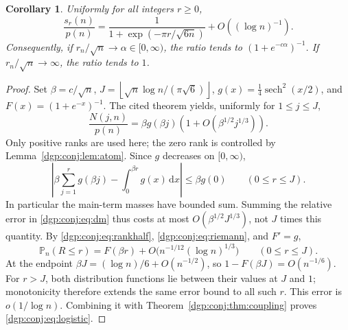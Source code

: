 \documentclass[11pt,letterpaper]{article}
\numberwithin{equation}{section}
\newtheorem{corollary}[theorem]{Corollary}
\theoremstyle{remark}\newtheorem{remark}[theorem]{Remark}
\newcommand{\PP}{\mathbb P}
\newcommand{\floor}[1]{\left\lfloor #1\right\rfloor}
\newcommand{\dd}{\,\mathrm d}
\DeclareMathOperator{\sech}{sech}
\begin{document}
\begin{corollary}\label{dgp:conj:cor:logistic}
Uniformly for all integers $r\geq0$,
\begin{equation}\label{dgp:conj:eq:logistic}
 \frac{s_r(n)}{p(n)}
 =\frac1{1+\exp(-\pi r/\sqrt{6n})}+O((\log n)^{-1}).
\end{equation}
Consequently, if $r_n/\sqrt n\to\alpha\in[0,\infty)$, the ratio
tends to $(1+e^{-c\alpha})^{-1}$. If $r_n/\sqrt n\to\infty$,
the ratio tends to $1$.
\end{corollary}
\begin{proof}
Set $\beta=c/\sqrt n$, $J=\floor{\sqrt n\log n/(\pi\sqrt6)}$,
$g(x)=\tfrac14\sech^2(x/2)$, and $F(x)=(1+e^{-x})^{-1}$.
The cited theorem yields, uniformly for $1\leq j\leq J$,
\begin{equation}\label{dgp:conj:eq:dm}
 \frac{N(j,n)}{p(n)}
 =\beta g(\beta j)\left(1+O(\beta^{1/2}j^{1/3})\right).
\end{equation}
Only positive ranks are used here; the zero rank is controlled
by Lemma~\ref{dgp:conj:lem:atom}. Since $g$ decreases on $[0,\infty)$,
\begin{equation}\label{dgp:conj:eq:riemann}
 \left|\beta\sum_{j=1}^r g(\beta j)
      -\int_0^{\beta r}g(x)\dd x\right|\leq\beta g(0)
 \qquad(0\leq r\leq J).
\end{equation}
In particular the main-term masses have bounded sum. Summing the
relative error in \eqref{dgp:conj:eq:dm} thus costs at most
$O(\beta^{1/2}J^{1/3})$, not $J$ times this quantity. By
\eqref{dgp:conj:eq:rankhalf}, \eqref{dgp:conj:eq:riemann}, and $F'=g$,
\[
 \PP_n(R\leq r)=F(\beta r)
 +O\bigl(n^{-1/12}(\log n)^{1/3}\bigr)
 \qquad(0\leq r\leq J).
\]
At the endpoint $\beta J=(\log n)/6+O(n^{-1/2})$, so
$1-F(\beta J)=O(n^{-1/6})$. For $r>J$, both distribution
functions lie between their values at $J$ and $1$; monotonicity
therefore extends the same error bound to all such $r$.
This error is $o(1/\log n)$. Combining it with
Theorem~\ref{dgp:conj:thm:coupling} proves \eqref{dgp:conj:eq:logistic}.
\end{proof}
\end{document}
